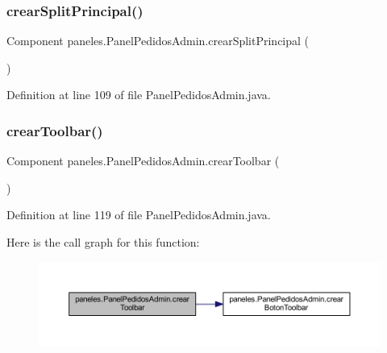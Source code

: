 \subsubsection{\texorpdfstring{crear\+Split\+Principal()}{crearSplitPrincipal()}}
{\footnotesize\ttfamily Component paneles.\+Panel\+Pedidos\+Admin.\+crear\+Split\+Principal (\begin{DoxyParamCaption}{ }\end{DoxyParamCaption})}



Definition at line 109 of file Panel\+Pedidos\+Admin.\+java.

\mbox{\label{classpaneles_1_1_panel_pedidos_admin_a3479b5a4aa009da3d3e99ad6ad689a57}} 
\subsubsection{\texorpdfstring{crear\+Toolbar()}{crearToolbar()}}
{\footnotesize\ttfamily Component paneles.\+Panel\+Pedidos\+Admin.\+crear\+Toolbar (\begin{DoxyParamCaption}{ }\end{DoxyParamCaption})}



Definition at line 119 of file Panel\+Pedidos\+Admin.\+java.

Here is the call graph for this function\+:
\nopagebreak
\begin{figure}[H]
\begin{center}
\leavevmode
\includegraphics[width=350pt]{classpaneles_1_1_panel_pedidos_admin_a3479b5a4aa009da3d3e99ad6ad689a57_cgraph}
\end{center}
\end{figure}
\mbox{\label{classpaneles_1_1_panel_pedidos_admin_a76287d5b003f15b41fd889936a6e817e}} 
